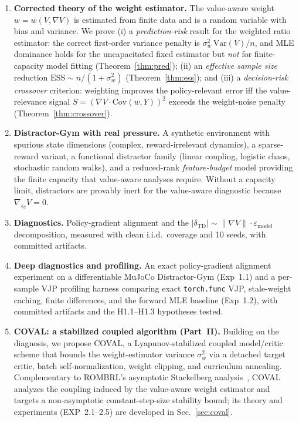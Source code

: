 \documentclass{article}
\theoremstyle{plain}
\begin{document}
\begin{enumerate}
\item \textbf{Corrected theory of the weight estimator.} The value-aware weight
  $w = w(V, \nabla V)$ is estimated from finite data and is a random variable with bias
  and variance. We prove (i) a \emph{prediction-risk} result for the weighted ratio
  estimator: the correct first-order variance penalty is
  $\sigma_w^2\,\mathrm{Var}(V)/n$, and MLE dominance holds for the uncapacitated fixed
  estimator but \emph{not} for finite-capacity model fitting (Theorem~\ref{thm:pred});
  (ii) an \emph{effective sample size} reduction $\mathrm{ESS} \sim n/(1+\sigma_w^2)$
  (Theorem~\ref{thm:ess}); and (iii) a \emph{decision-risk crossover} criterion:
  weighting improves the policy-relevant error iff the value-relevance signal
  $S = \left(\nabla V \cdot \mathrm{Cov}(w, Y)\right)^2$ exceeds the weight-noise penalty
  (Theorem~\ref{thm:crossover}).
\item \textbf{Distractor-Gym with real pressure.} A synthetic environment with spurious
  state dimensions (complex, reward-irrelevant dynamics), a sparse-reward variant, a
  functional distractor family (linear coupling, logistic chaos, stochastic random
  walks), and a reduced-rank \emph{feature-budget} model providing the finite capacity
  that value-aware analyses require. Without a capacity limit, distractors are provably
  inert for the value-aware diagnostic because $\nabla_{s_d} V = 0$.
\item \textbf{Diagnostics.} Policy-gradient alignment and the
  $\lvert\delta_{\mathrm{TD}}\rvert \sim \lVert \nabla V\rVert \cdot \varepsilon_{\mathrm{model}}$
  decomposition, measured with clean i.i.d.\ coverage and 10 seeds, with committed
  artifacts.
\item \textbf{Deep diagnostics and profiling.} An exact policy-gradient alignment
  experiment on a differentiable MuJoCo Distractor-Gym (Exp~1.1) and a per-sample VJP
  profiling harness comparing exact \texttt{torch.func} VJP, stale-weight caching, finite
  differences, and the forward MLE baseline (Exp~1.2), with committed artifacts and the
  H1.1--H1.3 hypotheses tested.
\item \textbf{COVAL: a stabilized coupled algorithm (Part~II).} Building on the
  diagnosis, we propose COVAL, a Lyapunov-stabilized coupled model/critic scheme that
  bounds the weight-estimator variance $\sigma_w^2$ via a detached target critic, batch
  self-normalization, weight clipping, and curriculum annealing. Complementary to
  ROMBRL's asymptotic Stackelberg analysis~\citep{chen2026rombri}, COVAL analyzes the
  coupling induced by the value-aware weight estimator and targets a non-asymptotic
  constant-step-size stability bound; its theory and experiments (EXP~2.1--2.5) are
  developed in Sec.~\ref{sec:coval}.
\end{enumerate}
\end{document}
